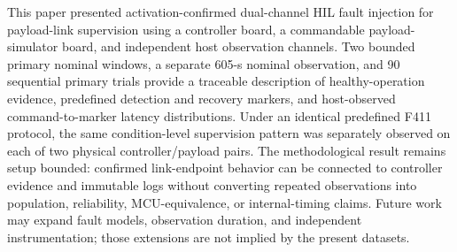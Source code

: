 \documentclass[conference]{IEEEtran}
\begin{document}
This paper presented activation-confirmed dual-channel HIL fault injection for payload-link supervision using a controller board, a commandable payload-simulator board, and independent host observation channels. Two bounded primary nominal windows, a separate 605-s nominal observation, and 90 sequential primary trials provide a traceable description of healthy-operation evidence, predefined detection and recovery markers, and host-observed command-to-marker latency distributions. Under an identical predefined F411 protocol, the same condition-level supervision pattern was separately observed on each of two physical controller/payload pairs. The methodological result remains setup bounded: confirmed link-endpoint behavior can be connected to controller evidence and immutable logs without converting repeated observations into population, reliability, MCU-equivalence, or internal-timing claims. Future work may expand fault models, observation duration, and independent instrumentation; those extensions are not implied by the present datasets.

\balance


\end{document}
